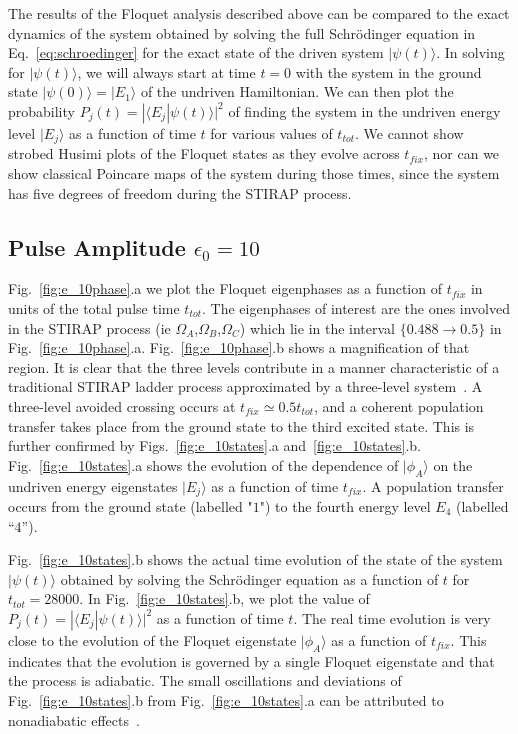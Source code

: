 \documentclass{article}
\begin{document}
The results of the Floquet analysis described above can be compared to the  exact dynamics of the system obtained  by solving the full Schr\"odinger equation in Eq.~\eqref{eq:schroedinger} for the exact state of the driven system $|{\psi}(t){\rangle}$.  In solving for $|{\psi}(t){\rangle}$,  we will always start at time $t=0$ with the system in the  ground state $|{\psi}(0){\rangle}=|E_1{\rangle}$  of the undriven Hamiltonian.   We can  then  plot the probability $P_j(t)=|\langle E_j|\psi(t) \rangle|^2$ of finding the system in the undriven energy level $|E_j \rangle$ as a function of time $t$ for various values of $t_{tot}$.
We cannot show strobed Husimi plots of the Floquet states as they evolve across $t_{fix}$, nor can we show classical Poincare maps of the system during those times, since the system has five degrees of freedom during the STIRAP process.

%
%
\subsection{Pulse Amplitude $\epsilon_0 = 10$}
%
%

Fig.~\ref{fig:e_10phase}.a we plot the Floquet eigenphases as a function of $t_{fix}$  in units of the total pulse time $t_{tot}$. The eigenphases of interest are the ones involved in the STIRAP process (ie $\Omega_A$,$\Omega_B$,$\Omega_C$) which lie in the interval $\lbrace 0.488{\rightarrow} 0.5\rbrace$ in Fig.~\ref{fig:e_10phase}.a.  Fig.~\ref{fig:e_10phase}.b shows a magnification of that region. It is clear that the three levels contribute in a manner characteristic of a  traditional STIRAP ladder process  approximated by a three-level system~\cite{stirap:review}.  A three-level avoided crossing occurs at $t_{fix}\simeq 0.5t_{tot}$, and  a coherent population transfer takes place from the ground state to the third excited state. This is further confirmed by Figs.~\ref{fig:e_10states}.a and~\ref{fig:e_10states}.b. Fig.~\ref{fig:e_10states}.a  shows the evolution of  the dependence of $|\phi_A\rangle$ on the undriven energy eigenstates $|E_j{\rangle}$  as a function of time $t_{fix}$.  A population transfer occurs  from the ground state (labelled "$1$") to the fourth energy level $E_4$ (labelled ``$4$''). 

Fig.~\ref{fig:e_10states}.b  shows the actual time evolution of the state of the system $|\psi(t){\rangle}$ obtained by solving the Schr\"odinger equation as a function of $t$ for $t_{tot} = 28000$. In Fig.~\ref{fig:e_10states}.b, we plot the value of $P_j(t)=|{\langle}E_j|\psi(t){\rangle}|^2$ as a function of time $t$. The real time evolution is very close to the evolution of the Floquet eigenstate $|\phi_A{\rangle}$ as a function of $t_{fix}$. This indicates that the evolution is governed by a single Floquet eigenstate and that the process is adiabatic. The small oscillations and deviations of Fig.~\ref{fig:e_10states}.b  from Fig.~\ref{fig:e_10states}.a  can be attributed to nonadiabatic effects~\cite{berry:base}.
\end{document}
